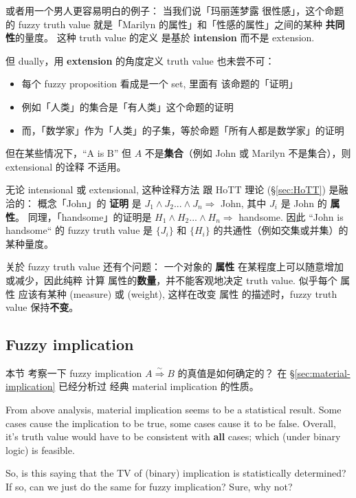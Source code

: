 或者用一个男人更容易明白的例子： 当我们说「玛丽莲梦露 很性感」，这个命题的 fuzzy truth value 就是「Marilyn 的属性」和「性感的属性」之间的某种 \textbf{共同性}的量度。  这种 truth value 的定义 是基於 \textbf{intension} 而不是 extension.

但 dually，用 \textbf{extension} 的角度定义 truth value 也未尝不可：
\begin{itemize}
	\setlength{\itemsep}{0.1ex}  %
	\item 每个 fuzzy proposition 看成是一个 set, 里面有 该命题的「证明」
	\item 例如「人类」的集合是「有人类」这个命题的证明
	\item 而，「数学家」作为「人类」的子集，等於命题「所有人都是数学家」的证明
\end{itemize}
但在某些情况下，``A is B'' 但 $A$ 不是\textbf{集合}（例如 John 或 Marilyn 不是集合），则 extensional 的诠释 不适用。 

无论 intensional 或 extensional, 这种诠释方法 跟 HoTT 理论 (\S\ref{sec:HoTT}) 是融洽的： 概念「John」的 \textbf{证明} 是 $J_1 \wedge J_2 ... \wedge J_n \Rightarrow$ John, 其中 $J_i$ 是 John 的 \textbf{属性}。  同理，「handsome」的证明是 $H_1 \wedge H_2 ... \wedge H_n \Rightarrow$ handsome.  因此 ``John is handsome`` 的 fuzzy truth value 是 $\{ J_i \}$ 和 $\{ H_i \}$ 的共通性（例如交集或并集）的某种量度。

关於 fuzzy truth value 还有个问题： 一个对象的 \textbf{属性} 在某程度上可以随意增加或减少，因此纯粹 计算 属性的\textbf{数量}，并不能客观地决定 truth value.  似乎每个 属性 应该有某种  (measure) 或  (weight), 这样在改变 属性 的描述时，fuzzy truth value 保持\textbf{不变}。

\subsection{Fuzzy implication}
\label{sec:fuzzy-implication}

本节 考察一下 fuzzy implication $A \stackrel{\sim}{\Rightarrow} B$ 的真值是如何确定的？  在  \S\ref{sec:material-implication} 已经分析过 经典 material implication 的性质。

From above analysis, material implication seems to be a statistical result.  Some cases cause the implication to be true, some cases cause it to be false.  Overall, it's truth value would have to be consistent with \textbf{all} cases;  which (under binary logic) is feasible.

So, is this saying that the TV of (binary) implication is statistically determined?  If so, can we just do the same for fuzzy implication?  Sure, why not?

